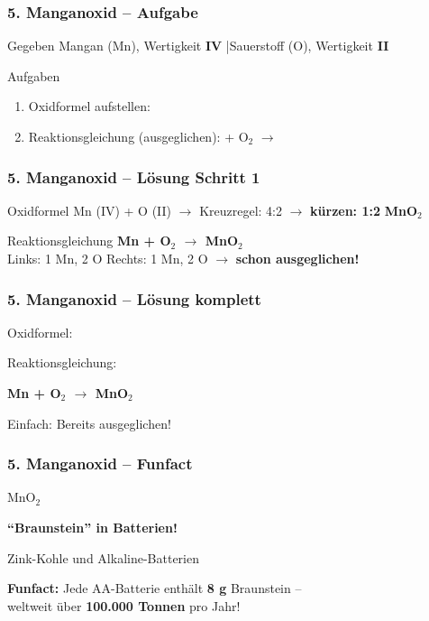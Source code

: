 \documentclass[aspectratio=169, 12pt]{beamer}
\newcommand{\lsg}[1]{\textcolor{loesung}{\textbf{#1}}}
\newcommand{\luecke}{\underline{\hspace{2.5cm}}}
\begin{document}
\begin{frame}
\frametitle{5. Manganoxid – Aufgabe}
\begin{block}{Gegeben}
Mangan (Mn), Wertigkeit \textbf{IV} \quad|\quad Sauerstoff (O), Wertigkeit \textbf{II}
\end{block}
\vspace{0.5cm}
\begin{block}{Aufgaben}
\begin{enumerate}
\item Oxidformel aufstellen: \luecke
\item Reaktionsgleichung (ausgeglichen): \quad \luecke{} + O$_2$ $\rightarrow$ \luecke
\end{enumerate}
\end{block}
\end{frame}

\begin{frame}
\frametitle{5. Manganoxid – Lösung Schritt 1}
\begin{block}{Oxidformel}
Mn (IV) + O (II) $\rightarrow$ Kreuzregel: 4:2 $\rightarrow$ \textbf{kürzen: 1:2} \hfill \lsg{MnO$_2$}
\end{block}
\vspace{0.3cm}
\begin{block}{Reaktionsgleichung}
\lsg{Mn + O$_2$ $\rightarrow$ MnO$_2$}\\[0.3cm]
Links: 1 Mn, 2 O \quad Rechts: 1 Mn, 2 O \quad $\rightarrow$ \textbf{schon ausgeglichen!}
\end{block}
\end{frame}

\begin{frame}
\frametitle{5. Manganoxid – Lösung komplett}
\begin{center}
\vspace{0.5cm}
{\large Oxidformel:} \quad {\Huge \lsg{MnO$_2$}}
\vspace{1cm}

{\large Reaktionsgleichung:}
\vspace{0.5cm}

{\Huge \lsg{Mn + O$_2$ $\rightarrow$ MnO$_2$}}
\vspace{0.5cm}

{\small Einfach: Bereits ausgeglichen! \checkmark}
\end{center}
\end{frame}

\begin{frame}
\frametitle{5. Manganoxid – Funfact}
\begin{center}
\vspace{0.3cm}
{\Huge \textcolor{chemie}{MnO$_2$}}
\vspace{0.8cm}

{\Large\textbf{``Braunstein'' in Batterien!}}
\vspace{0.5cm}

Zink-Kohle und Alkaline-Batterien
\vspace{0.8cm}

\textcolor{akzent}{\textbf{Funfact:}} Jede AA-Batterie enthält \textbf{8 g} Braunstein –\\
weltweit über \textbf{100.000 Tonnen} pro Jahr!
\end{center}
\end{frame}
\end{document}
